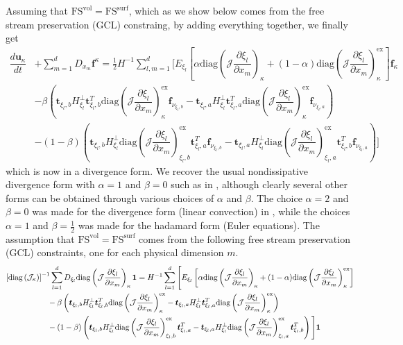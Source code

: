 \documentclass[12pt,a4paper]{article}
\newcommand{\pder}[2][]{\dfrac{\partial #1}{\partial #2}} %
\newcommand{\der}[2][]{\dfrac{d #1}{d #2}} %
\newcommand{\fn}[1]{\mathcal{#1}} %
\begin{document}
Assuming that $\text{FS}^{\text{vol}} = \text{FS}^{\text{surf}}$, which as we show below comes from the free stream preservation (GCL) constraing, by adding everything together, we finally get
\begin{align*}
\der[\bm{u}_\kappa]{t} &+ \sum_{m=1}^d D_{x_m} \bm{f}^\kappa  =  \frac{1}{2} H^{-1} \sum_{l,m=1}^d \Bigg[ E_{\xi_l} \left[ \alpha \text{diag}  \left( \fn{J} \pder[\xi_l]{x_m} \right)_{\kappa} + (1-\alpha) \text{diag}  \left( \fn{J} \pder[\xi_l]{x_m} \right)_{\kappa}^\text{ex} \right] \bm{f}_{\kappa} \\
& - \beta \left(  \bm{t}_{\xi_l, b} H^{\bot}_{\xi_l} \bm{t}_{\xi_l, b}^T \text{diag} \left( \fn{J} \pder[\xi_l]{x_m} \right)_{\kappa}^\text{ex} \bm{f}_{\nu_{\xi_l,b}} -  \bm{t}_{\xi_l, a} H^{\bot}_{\xi_l} \bm{t}_{\xi_l, a}^T \text{diag} \left( \fn{J} \pder[\xi_l]{x_m} \right)_{\kappa}^\text{ex} \bm{f}_{\nu_{\xi_l,a}} \right) \\
& - (1-\beta) \left( \bm{t}_{\xi_l, b} H^{\bot}_{\xi_l}  \text{diag} \left( \fn{J} \pder[\xi_l]{x_m} \right)_{\xi_l,b}^\text{ex} \bm{t}_{\xi_l, a}^T \bm{f}_{\nu_{\xi_l,b}} - \bm{t}_{\xi_l, a} H^{\bot}_{\xi_l} \text{diag} \left( \fn{J} \pder[\xi_l]{x_m} \right)_{\xi_l,a}^\text{ex} \bm{t}_{\xi_l, b}^T \bm{f}_{\nu_{\xi_l,a}} \right) \Bigg]
\end{align*}
which is now in a divergence form. We recover the usual nondissipative divergence form with $\alpha = 1$ and $\beta=0$ such as in \cite{del_rey_fernandez_extension_2019}, although clearly several other forms can be obtained through various choices of $\alpha$ and $\beta$. The choice $\alpha = 2$ and $\beta = 0$ was made for the divergence form (linear convection) in \cite{nolasco_optimized_2019}, while the choices $\alpha = 1$ and $\beta = \frac{1}{2}$ was made for the hadamard form (Euler equations). The assumption that  $\text{FS}^{\text{vol}} = \text{FS}^{\text{surf}}$ comes from the following free stream preservation (GCL) constraints, one for each physical dimension $m$.
\begin{align*}
 \left[ \text{diag}\left( \fn{J}_\kappa \right) \right]^{-1} \sum_{l=1}^d  D_{\xi_l} \text{diag} \left( \fn{J} \pder[\xi_l]{x_m} \right)_\kappa \bm{1} &= H^{-1} \sum_{l=1}^d \Bigg[ E_{\xi_l}  \left[ \alpha \text{diag}  \left( \fn{J} \pder[\xi_l]{x_m} \right)_{\kappa} + (1-\alpha) \text{diag}  \left( \fn{J} \pder[\xi_l]{x_m} \right)_{\kappa}^\text{ex} \right] \\
& \hspace{-4cm} - \beta \left(  \bm{t}_{\xi_l, b} H^{\bot}_{\xi_l} \bm{t}_{\xi_l, b}^T \text{diag} \left( \fn{J} \pder[\xi_l]{x_m} \right)_{\kappa}^\text{ex} - \bm{t}_{\xi_l, a} H^{\bot}_{\xi_l} \bm{t}_{\xi_l, a}^T \text{diag} \left( \fn{J} \pder[\xi_l]{x_m} \right)_{\kappa}^\text{ex} \right) \\
& \hspace{-4cm} - (1-\beta) \left( \bm{t}_{\xi_l, b} H^{\bot}_{\xi_l}  \text{diag} \left( \fn{J} \pder[\xi_l]{x_m} \right)_{\xi_l,b}^\text{ex} \bm{t}_{\xi_l, a}^T - \bm{t}_{\xi_l, a} H^{\bot}_{\xi_l} \text{diag} \left( \fn{J} \pder[\xi_l]{x_m} \right)_{\xi_l,a}^\text{ex} \bm{t}_{\xi_l, b}^T \right) \Bigg] \bm{1}
\end{align*}
\end{document}
